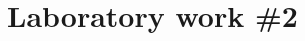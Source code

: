 \documentclass[12pt,a4paper,titlepage]{article}
\begin{document}
\begin{titlepage}
\begin{center}
      \vspace{5 mm}






      \vfill %
      \end{center}
      
\end{titlepage}

\cleardoublepage

\newpage

\setcounter{page}{1}
\setcounter{secnumdepth}{4}

\cleardoublepage


{}
\section*{Laboratory work \#2}

\end{document}
